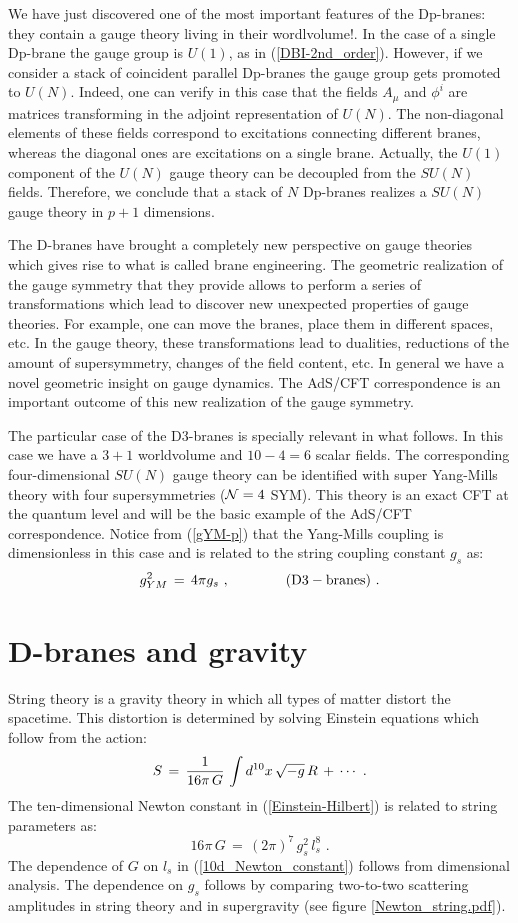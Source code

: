 \documentclass[12pt,notitlepage,a4paper]{article}
\newcommand{\beq}{\begin{equation}}
\newcommand{\eeq}{\end{equation}}
\begin{document}
We have just discovered one of the most important features of the Dp-branes: they contain a gauge theory living in their wordlvolume!. In the case of a single Dp-brane the gauge group is $U(1)$, as in (\ref{DBI-2nd_order}).  However, if we consider a stack of coincident parallel Dp-branes the gauge group gets promoted to $U(N)$. Indeed, one can verify in this case that the fields $A_{\mu}$ and $\phi^i$ are matrices transforming in the adjoint representation of $U(N)$. The non-diagonal elements of these fields correspond to excitations connecting different branes, whereas the diagonal ones are excitations on a single brane. Actually, the $U(1)$ component of the $U(N)$ gauge theory can be decoupled from the $SU(N)$ fields. Therefore, we conclude that a stack of  $N$ Dp-branes realizes a $SU(N)$ gauge theory in $p+1$ dimensions. 


The D-branes have brought a completely new perspective on gauge theories which gives rise to what is called brane engineering. The geometric realization of the gauge symmetry that they  provide allows to perform a series of transformations which lead to discover new unexpected  properties of gauge theories. For example, 
one can move the branes, place them in different spaces, etc. In the gauge theory, these transformations lead to dualities, reductions of the amount of supersymmetry, changes of  the field content, etc. In general we have a novel geometric insight on gauge dynamics. The AdS/CFT correspondence is an important outcome of this new realization of the gauge symmetry. 


The particular case of the D3-branes is specially relevant in what follows. In this case we have a $3+1$ worldvolume and $10-4=6$ scalar fields. The corresponding four-dimensional $SU(N)$ gauge theory can be identified with super Yang-Mills theory with four supersymmetries (${\cal N}=4$ SYM). This theory is an exact CFT at the quantum level  and will be the basic example of the AdS/CFT correspondence. Notice from (\ref{gYM-p}) that the Yang-Mills coupling is dimensionless in this case and is related to the string coupling constant $g_s$ as:
\beq
g^2_{YM}\,=\,4\pi g_s\,\,,
\qquad\qquad
({\rm D3-branes})\,\,.
\label{gYM-p3}
\eeq



\section{D-branes and gravity}

String theory is a gravity theory in which all types of matter distort the spacetime. This distortion is determined by  solving Einstein equations which follow from the action:
\beq
S\,=\,{1\over 16\pi\, G}\,\int d^{10} x\,\sqrt{-g}\, R\,+\,\cdots\,\,.
\label{Einstein-Hilbert}
\eeq
The ten-dimensional Newton constant  in (\ref{Einstein-Hilbert}) is related to string parameters as:
\beq
16\pi\, G\,=\,(2\pi)^7\,g_s^2\,l_s^8\,\,.
\label{10d_Newton_constant}
\eeq
The dependence of $G$ on $l_s$ in (\ref{10d_Newton_constant})  follows from dimensional analysis. The dependence on $g_s$ follows by comparing two-to-two scattering amplitudes in string theory and in supergravity (see figure \ref{Newton_string.pdf}). 
\end{document}
